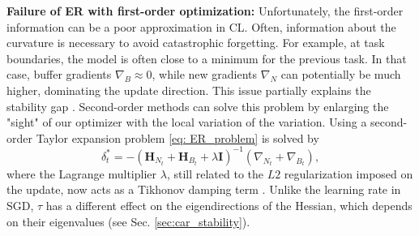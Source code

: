 \textbf{Failure of ER with first-order optimization:}
Unfortunately, the first-order information can be a poor approximation in CL. Often, information about the curvature is necessary to avoid catastrophic forgetting. For example, at task boundaries, the model is often close to a minimum for the previous task. In that case, buffer gradients $\nabla_B \approx 0$, while new gradients $\nabla_N$ can potentially be much higher, dominating the update direction. This issue partially explains the stability gap \cite{lirias4071238}.
Second-order methods can solve this problem by enlarging the "sight" of our optimizer with the local variation of the variation.
Using a second-order Taylor expansion problem \ref{eq: ER_problem} is solved by
\begin{equation*}
    \delta_t^* = -(\mathbf{H}_{N_t} + \mathbf{H}_{B_t} + \lambda \mathbf{I})^{-1}(\nabla_{N_t} + \nabla_{B_t}),
\end{equation*}
where the Lagrange multiplier $\lambda$, still related to the $L2$ regularization imposed on the update, now acts as a Tikhonov damping term \cite{martens2012training}. Unlike the learning rate in SGD, $\tau$ has a different effect on the eigendirections of the Hessian, which depends on their eigenvalues (see Sec. \ref{sec:car_stability}). 

